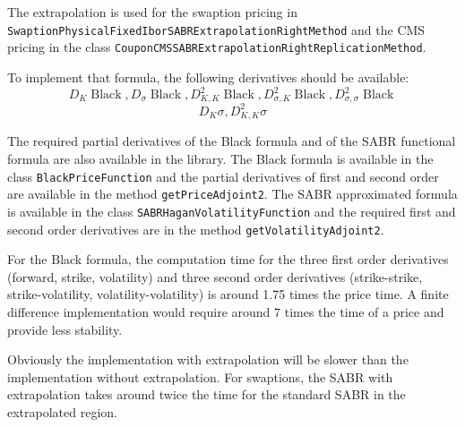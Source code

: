 \documentclass[]{amsart}
\newcommand{\black}{{\operatorname{Black}}}
\newcommand{\class}[1]{{\texttt{#1}}}
\begin{document}
The extrapolation is used for the swaption pricing in \class{SwaptionPhysicalFixedIborSABRExtrapolationRightMethod} and the CMS pricing in the class \class{CouponCMSSABRExtrapolationRightReplicationMethod}.

To implement that formula, the following derivatives should be available:
\[
D_K \black, D_\sigma \black, D^2_{K,K} \black, D^2_{\sigma,K}\black, D^2_{\sigma,\sigma}\black
\]
\[
D_K \sigma, D^2_{K,K} \sigma
\]

The required partial derivatives of the Black formula and of the \cite{HKL.2002.1} SABR functional formula are also available in the library. The Black formula is available in the class \class{BlackPriceFunction} and the partial derivatives of first and second order are available in the method \class{getPriceAdjoint2}. The SABR approximated formula is available in the class \class{SABRHaganVolatilityFunction} and the required first and second order derivatives are in the method \class{getVolatilityAdjoint2}.

For the Black formula, the computation time for the three first order derivatives (forward, strike, volatility) and three second order derivatives (strike-strike, strike-volatility, volatility-volatility) is around 1.75 times the price time. A finite difference implementation would require around 7 times the time of a price and provide less stability.

Obviously the implementation with extrapolation will be slower than the implementation without extrapolation. For swaptions, the SABR with extrapolation takes around twice the time for the standard SABR in the extrapolated region.




\tableofcontents
\end{document}
